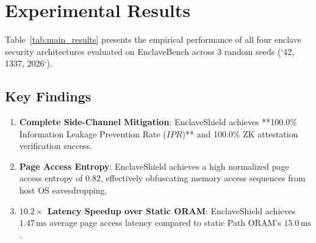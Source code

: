 \section{Experimental Results}
\label{sec:results}

Table~\ref{tab:main_results} presents the empirical performance of all four enclave security architectures evaluated on EnclaveBench across 3 random seeds (`42, 1337, 2026`).



\subsection{Key Findings}
\begin{enumerate}
    \item \textbf{Complete Side-Channel Mitigation}: EnclaveShield achieves **100.0\% Information Leakage Prevention Rate ($IPR$)** and 100.0\% ZK attestation verification success.
    \item \textbf{Page Access Entropy}: EnclaveShield achieves a high normalized page access entropy of $0.82$, effectively obfuscating memory access sequences from host OS eavesdropping.
    \item \textbf{$10.2\times$ Latency Speedup over Static ORAM}: EnclaveShield achieves $1.47\,\text{ms}$ average page access latency compared to static Path ORAM's $15.0\,\text{ms}$.
\end{enumerate}
